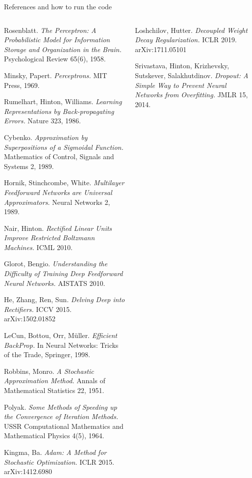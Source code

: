 \documentclass[aspectratio=169,10pt]{beamer}
\begin{document}
\begin{frame}{References and how to run the code}
\fontsize{6.4}{7.9}\selectfont
\begin{columns}[T,onlytextwidth]
\begin{enumerate}[{[1]}]\setlength{\itemsep}{0.6pt}
\item Rosenblatt. \emph{The Perceptron: A Probabilistic Model for Information Storage and Organization in the Brain.} Psychological Review 65(6), 1958.
\item Minsky, Papert. \emph{Perceptrons.} MIT Press, 1969.
\item Rumelhart, Hinton, Williams. \emph{Learning Representations by Back-propagating Errors.} Nature 323, 1986.
\item Cybenko. \emph{Approximation by Superpositions of a Sigmoidal Function.} Mathematics of Control, Signals and Systems 2, 1989.
\item Hornik, Stinchcombe, White. \emph{Multilayer Feedforward Networks are Universal Approximators.} Neural Networks 2, 1989.
\item Nair, Hinton. \emph{Rectified Linear Units Improve Restricted Boltzmann Machines.} ICML 2010.
\item Glorot, Bengio. \emph{Understanding the Difficulty of Training Deep Feedforward Neural Networks.} AISTATS 2010.
\item He, Zhang, Ren, Sun. \emph{Delving Deep into Rectifiers.} ICCV 2015. arXiv:1502.01852
\item LeCun, Bottou, Orr, M\"uller. \emph{Efficient BackProp.} In Neural Networks: Tricks of the Trade, Springer, 1998.
\item Robbins, Monro. \emph{A Stochastic Approximation Method.} Annals of Mathematical Statistics 22, 1951.
\item Polyak. \emph{Some Methods of Speeding up the Convergence of Iteration Methods.} USSR Computational Mathematics and Mathematical Physics 4(5), 1964.
\item Kingma, Ba. \emph{Adam: A Method for Stochastic Optimization.} ICLR 2015. arXiv:1412.6980
\end{enumerate}
\begin{enumerate}[{[1]}]\setlength{\itemsep}{0.6pt}
\setcounter{enumi}{12}
\item Loshchilov, Hutter. \emph{Decoupled Weight Decay Regularization.} ICLR 2019. arXiv:1711.05101
\item Srivastava, Hinton, Krizhevsky, Sutskever, Salakhutdinov. \emph{Dropout: A Simple Way to Prevent Neural Networks from Overfitting.} JMLR 15, 2014.

\end{enumerate}
\end{columns}
\end{frame}
\end{document}
